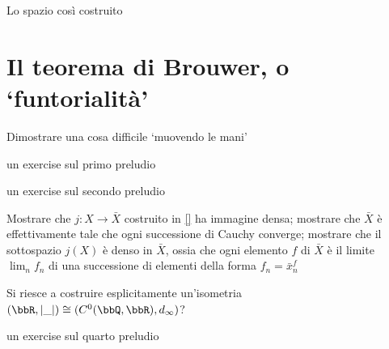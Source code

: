 Lo spazio così costruito
\section*{Il teorema di Brouwer, o `funtorialità'}
Dimostrare una cosa difficile `muovendo le mani'
\begin{exercises}
\item \label{ex_prelude_1} un exercise sul primo preludio
\item \label{ex_prelude_2} un exercise sul secondo preludio
\item \label{ex_prelude_3} Mostrare che \(j : X\to \bar X\) costruito in \autoref{} ha immagine densa; mostrare che \(\bar X\) è effettivamente tale che ogni successione di Cauchy converge; mostrare che il sottospazio \(j(X)\) è denso in \(\bar X\), ossia che ogni elemento \(f\) di \(\bar X\) è il limite \(\lim_n f_n\) di una successione di elementi della forma \(f_n=\bar x_n^f\)

Si riesce a costruire esplicitamente un'isometria \((\bbR, |\_|) \cong (C^0(\bbQ,\bbR), d_\infty)\)?
\item \label{ex_prelude_4} un exercise sul quarto preludio
\end{exercises}
